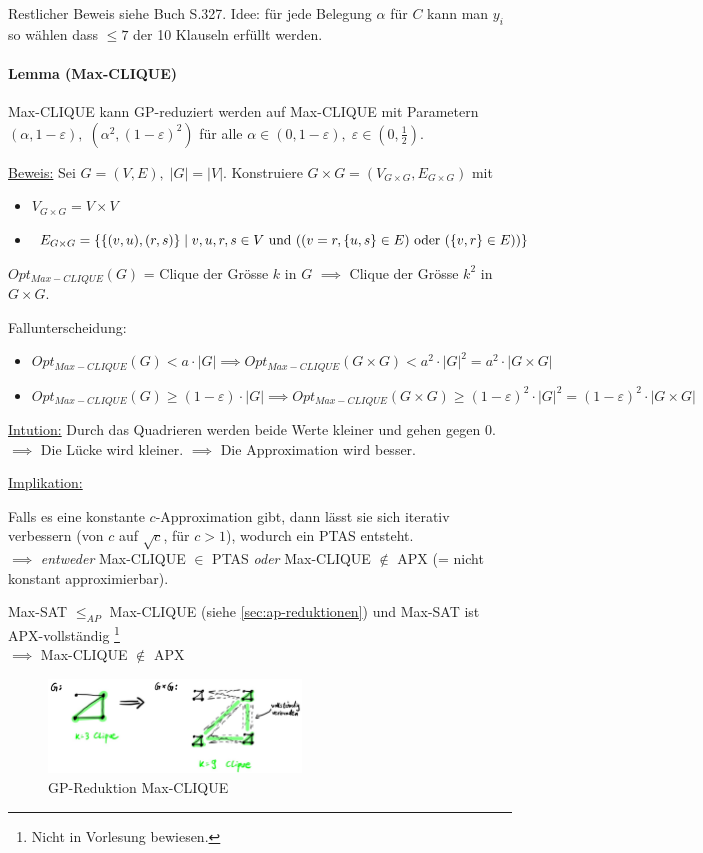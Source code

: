 Restlicher Beweis siehe Buch S.327.
Idee: für jede Belegung $\alpha$ für $C$ kann man $y_i$ so wählen dass $\leq 7$ der 10 Klauseln
erfüllt werden.

\paragraph{Lemma (Max-CLIQUE)}
Max-CLIQUE kann GP-reduziert werden auf Max-CLIQUE mit Parametern
$(\alpha, 1-\varepsilon), \; (\alpha^2, (1-\varepsilon)^2)$
für alle $\alpha \in (0, 1-\varepsilon), \; \varepsilon \in (0, \frac{1}{2})$.

\underline{Beweis:}
Sei $G=(V,E), \; |G|=|V|$.
Konstruiere $G \times G = ( V_{G \times G}, E_{G \times G} )$ mit
\begin{itemize}
    \item $V_{G \times G} = V \times V$
    \item $E_{G \times G} = \left\{ \{ (v,u) , (r,s) \} \; | \; v,u,r,s \in V \text{ und }
    ( ( v=r , \{u,s\} \in E) \text{ oder } (\{v,r\} \in E) ) \right\}$
\end{itemize}

$Opt_{Max-CLIQUE}(G)$ = Clique der Grösse $k$ in $G$ $\implies$ Clique der Grösse $k^2$ in $G \times G$.

Fallunterscheidung:
\begin{itemize}
    \item $ Opt_{Max-CLIQUE}(G) < a \cdot |G| \implies
        Opt_{Max-CLIQUE}(G \times G) < a^2 \cdot |G|^2 = a^2 \cdot |G \times G|$
    \item $ Opt_{Max-CLIQUE}(G) \geq (1-\varepsilon) \cdot |G| \implies
        Opt_{Max-CLIQUE}(G \times G) \geq (1-\varepsilon)^2 \cdot |G|^2 = (1-\varepsilon)^2 \cdot |G \times G|$
\end{itemize}

\underline{Intution:}
Durch das Quadrieren werden beide Werte kleiner und gehen gegen 0.
$\implies$  Die Lücke wird kleiner. $\implies$  Die Approximation wird besser.

\underline{Implikation:}

Falls es eine konstante $c$-Approximation gibt, dann lässt sie sich iterativ verbessern
(von $c$ auf $\sqrt{c}$, für $c>1$), wodurch ein PTAS entsteht. \\
$\implies$ \emph{entweder} Max-CLIQUE $\in$ PTAS \emph{oder} Max-CLIQUE $\notin$ APX
(= nicht konstant approximierbar).

Max-SAT $\leq_{AP}$ Max-CLIQUE (siehe \autoref{sec:ap-reduktionen}) und Max-SAT ist APX-vollständig
\footnote{Nicht in Vorlesung bewiesen.} \\
$\implies$ Max-CLIQUE $\notin$ APX

\begin{figure}[h]
    \centering
    \includegraphics[width=0.6\textwidth]{images/gp-reduktion-max-clique.jpg}
    \caption{GP-Reduktion Max-CLIQUE}
\end{figure}

